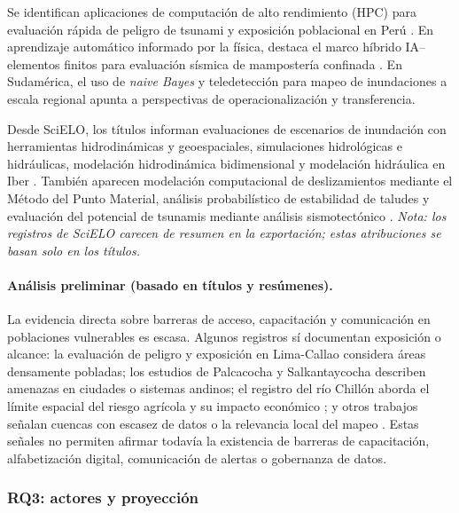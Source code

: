 \documentclass[12pt,a4paper]{article}
\begin{document}
Se identifican aplicaciones de computación de alto rendimiento (HPC) para evaluación rápida de peligro de tsunami y exposición poblacional en Perú \parencite{garcia2025parallel}. En aprendizaje automático informado por la física, destaca el marco híbrido IA--elementos finitos para evaluación sísmica de mampostería confinada \parencite{yupanqui2025hybrid}. En Sudamérica, el uso de \textit{naive Bayes} y teledetección para mapeo de inundaciones a escala regional \parencite{kuchinski2025regional} apunta a perspectivas de operacionalización y transferencia. 

Desde SciELO, los títulos informan evaluaciones de escenarios de inundación con herramientas hidrodinámicas y geoespaciales, simulaciones hidrológicas e hidráulicas, modelación hidrodinámica bidimensional y modelación hidráulica en Iber \parencite{snchezpineda2025evaluaci, rojasguerrero2025lisis, la2025modelizaci, gutirrezgarca2022modelaci}. También aparecen modelación computacional de deslizamientos mediante el Método del Punto Material, análisis probabilístico de estabilidad de taludes y evaluación del potencial de tsunamis mediante análisis sismotectónico \parencite{lemus2024modelaci, ariasvalencia2024lisis, zamora2021evaluaci}. \textit{Nota: los registros de SciELO carecen de resumen en la exportación; estas atribuciones se basan solo en los títulos.}
\label{sec:rq2}
\paragraph*{Análisis preliminar (basado en títulos y resúmenes).}
La evidencia directa sobre barreras de acceso, capacitación y comunicación en poblaciones vulnerables es escasa. Algunos registros sí documentan exposición o alcance: la evaluación de peligro y exposición en Lima-Callao \parencite{quesquen2025tsunami, androsov2024nonlinear, garcia2025parallel} considera áreas densamente pobladas; los estudios de Palcacocha y Salkantaycocha \parencite{stuartsmith2021increased, vilca2021glacial} describen amenazas en ciudades o sistemas andinos; el registro del río Chillón aborda el límite espacial del riesgo agrícola y su impacto económico \parencite{lpezsilva2025spatial}; y otros trabajos señalan cuencas con escasez de datos o la relevancia local del mapeo \parencite{marin2021assessing, kuchinski2025regional}. Estas señales no permiten afirmar todavía la existencia de barreras de capacitación, alfabetización digital, comunicación de alertas o gobernanza de datos.

\subsubsection{RQ3: actores y proyección}
\label{sec:rq3}
\end{document}
